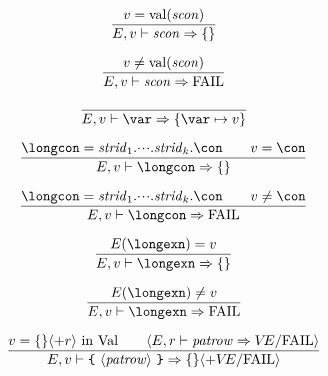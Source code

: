 \begin{equation}	%
\frac{\V=\sconval(\scon)}
     {\E,\V\ts\scon\ra \emptymap}\index{55.35}
\end{equation}

\begin{equation}	%
\label{sconpat-dyn-rule2}
\frac{\V\neq\sconval(\scon)}
     {\E,\V\ts\scon\ra \FAIL}\index{55.36}
\end{equation}

\begin{equation}	%
\frac{}
     {\E,\V\ts\var\ra \{\var\mapsto\V\} }
\end{equation}

\begin{equation}	%
\frac{\longcon=\strid_1.\cdots.\strid_k.\con\qquad\V=\con }
     {\E,\V\ts\longcon\ra \emptymap}
\end{equation}

\begin{equation}
\label{conapat-dyn-rule2}
\frac{\longcon=\strid_1.\cdots.\strid_k.\con\qquad\V\neq\con}
     {\E,\V\ts\longcon\ra\FAIL}
\end{equation}

\begin{equation}        %
\frac{\E(\longexn)=\V}
     {\E,\V\ts\longexn\ra\emptymap}
\end{equation}

\begin{equation}	
\label{exconapat-dyn-rule2}
\frac{\E(\longexn)\neq\V}
     {\E,\V\ts\longexn\ra\FAIL}\index{56.0}
\end{equation}


\begin{equation}	%
\frac{\V=\emptymap\langle+\r\rangle\ \In\ \Val\qquad
      \langle\E,\r\ts\labpats\ra\VE/\fail\rangle}
     {\E,\V\ts\lttbrace\ \langle\labpats\rangle\ \rttbrace\ra\emptymap\langle+\VE/\fail\rangle}
\end{equation}

